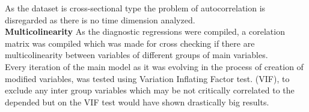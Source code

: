 \documentclass[]{article}
\begin{document}
As the dataset is cross-sectional type the problem of autocorrelation is disregarded as there is no time dimension analyzed.\\

\textbf{Multicolinearity}
As the diagnostic regressions were compiled, a corelation matrix was compiled which was made for cross checking if there are multicolinearity between variables of different groups of main variables.\\

Every iteration of the main model as it was evolving in the process of creation of modified variables, was tested using Variation Inflating Factor test. (VIF), to exclude any inter group variables which may be not critically correlated to the depended but on the VIF test would have shown drastically big results.
\end{document}
